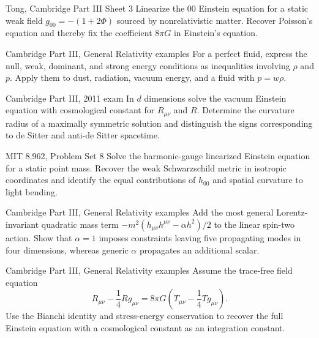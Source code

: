 \begin{exercise}{Tong, Cambridge Part III Sheet 3}
Linearize the \(00\) Einstein equation for a static weak field
\(g_{00}=-(1+2\Phi)\) sourced by nonrelativistic matter.  Recover Poisson's
equation and thereby fix the coefficient \(8\pi G\) in Einstein's equation.
\end{exercise}

\begin{exercise}{Cambridge Part III, General Relativity examples}
For a perfect fluid, express the null, weak, dominant, and strong energy
conditions as inequalities involving \(\rho\) and \(p\).  Apply them to dust,
radiation, vacuum energy, and a fluid with \(p=w\rho\).
\end{exercise}

\begin{exercise}{Cambridge Part III, 2011 exam}
In \(d\) dimensions solve the vacuum Einstein equation with cosmological
constant for \(R_{\mu\nu}\) and \(R\).  Determine the curvature radius of a
maximally symmetric solution and distinguish the signs corresponding to de
Sitter and anti-de Sitter spacetime.
\end{exercise}

\begin{exercise}{MIT 8.962, Problem Set 8}
Solve the harmonic-gauge linearized Einstein equation for a static point mass.
Recover the weak Schwarzschild metric in isotropic coordinates and identify
the equal contributions of \(h_{00}\) and spatial curvature to light bending.
\end{exercise}

\begin{exercise}{Cambridge Part III, General Relativity examples}
Add the most general Lorentz-invariant quadratic mass term
\(-m^2(h_{\mu\nu}h^{\mu\nu}-\alpha h^2)/2\) to the linear spin-two action.
Show that \(\alpha=1\) imposes constraints leaving five propagating modes in
four dimensions, whereas generic \(\alpha\) propagates an additional scalar.
\end{exercise}

\begin{exercise}{Cambridge Part III, General Relativity examples}
Assume the trace-free field equation
\[
R_{\mu\nu}-\frac14Rg_{\mu\nu}
=8\pi G\left(T_{\mu\nu}-\frac14Tg_{\mu\nu}\right).
\]
Use the Bianchi identity and stress-energy conservation to recover the full
Einstein equation with a cosmological constant as an integration constant.
\end{exercise}

